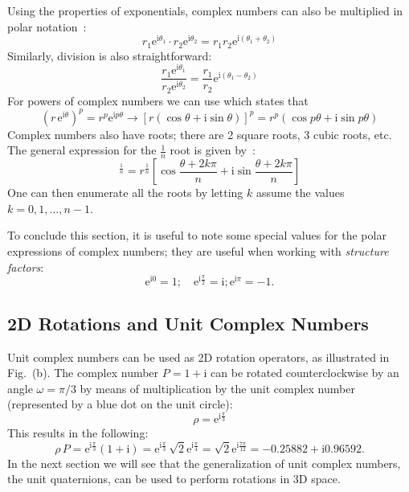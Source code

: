 Using the properties of exponentials, complex numbers can also be multiplied in polar notation~:
\begin{equation}
	r_1\mathrm{e}^{\mathrm{i}\theta_1}\cdot r_2\mathrm{e}^{\mathrm{i}\theta_2}=r_1r_2\mathrm{e}^{\mathrm{i}(\theta_1+\theta_2)}
\end{equation}
Similarly, division is also straightforward:
\begin{equation}
	\frac{r_1\mathrm{e}^{\mathrm{i}\theta_1}}{r_2\mathrm{e}^{\mathrm{i}\theta_2}}=\frac{r_1}{r_2}\mathrm{e}^{\mathrm{i}(\theta_1-\theta_2)}
\end{equation}
For powers of complex numbers we can use  which states that
\begin{equation}
	\left(r\,\mathrm{e}^{\mathrm{i}\theta}\right)^p= r^p\mathrm{e}^{\mathrm{i}p\theta} \rightarrow [r(\cos\theta+\mathrm{i}\sin\theta)]^p=r^p(\cos p\theta+\mathrm{i}\sin p\theta)
\end{equation}
Complex numbers also have roots;  there are 2 square roots, 3 cubic roots, etc.  The general expression for the $\frac{1}{n}$ root is given by~:
\begin{equation}
[r(\cos\theta+\mathrm{i}\sin\theta)]^{\frac{1}{n}}=r^{\frac{1}{n}}\left[\cos\frac{\theta+2k\pi}{n}+\mathrm{i}\sin\frac{\theta+2k\pi}{n}\right]
\end{equation}
One can then enumerate all the roots by letting $k$ assume the values $k=0,1,\ldots,n-1$.

To conclude this section, it is useful to note some special values for the polar expressions of complex numbers; they are useful when working with  \textit{structure factors}:
\begin{equation}
	\mathrm{e}^{\mathrm{i}0} = 1;\quad \mathrm{e}^{\mathrm{i}\frac{\pi}{2}} = \mathrm{i}; \mathrm{e}^{\mathrm{i}\pi} = -1.
\end{equation}

\subsection{2D Rotations and Unit Complex Numbers}

Unit complex numbers can be used as 2D rotation operators, as illustrated in Fig.~(b). The complex number $P=1+\mathrm{i}$ can be rotated counterclockwise by an angle $\omega=\pi/3$ by means of multiplication by the unit complex number (represented by a blue dot on the unit circle):
\begin{equation}
	\rho=\mathrm{e}^{\mathrm{i}\frac{\pi}{3}}
\end{equation}
This results in the following:
\begin{equation}
	\rho\,P = \mathrm{e}^{\mathrm{i}\frac{\pi}{3}} (1+\mathrm{i}) = \mathrm{e}^{\mathrm{i}\frac{\pi}{3}}\,\sqrt{2}\mathrm{e}^{\mathrm{i}\frac{\pi}{4}}=
	\sqrt{2}\mathrm{e}^{\mathrm{i}\frac{7\pi}{12}} = -0.25882 + \mathrm{i} 0.96592.
\end{equation}
In the next section we will see that the generalization of unit complex numbers, the unit quaternions, can be used to perform rotations in 3D space.


